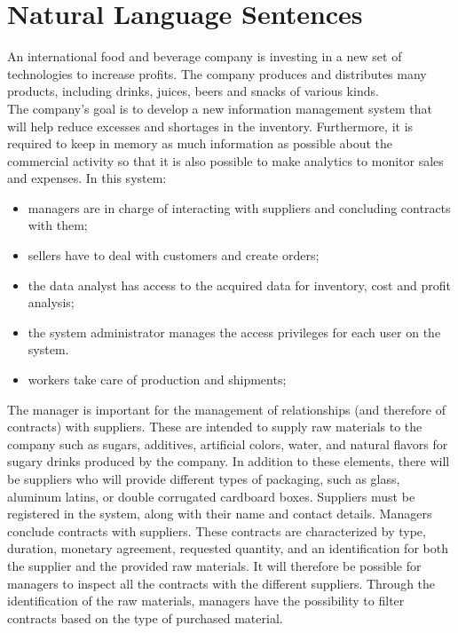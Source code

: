 \section{Natural Language Sentences}

An international food and beverage company is investing in a new set of technologies to increase profits. The company produces and distributes many products, including drinks, juices, beers and snacks of various kinds.\\

The company's goal is to develop a new information management system that will help reduce excesses and shortages in the inventory. Furthermore, it is required to keep in memory as much information as possible about the commercial activity so that it is also possible to make analytics to monitor sales and expenses. In this system:
\begin{itemize}
    \item managers are in charge of interacting with suppliers and concluding contracts with them;
    \item sellers have to deal with customers and create orders;
    \item the data analyst has access to the acquired data for inventory, cost and profit analysis;
    \item the system administrator manages the access privileges for each user on the system.
    \item workers take care of production and shipments;
\end{itemize}

The manager is important for the management of relationships (and therefore of contracts) with suppliers. These are intended to supply raw materials to the company such as sugars, additives, artificial colors, water, and natural flavors for sugary drinks produced by the company. In addition to these elements, there will be suppliers who will provide different types of packaging, such as glass, aluminum latins, or double corrugated cardboard boxes. Suppliers must be registered in the system, along with their name and contact details. Managers conclude contracts with suppliers. These contracts are characterized by type, duration, monetary agreement, requested quantity, and an identification for both the supplier and the provided raw materials. It will therefore be possible for managers to inspect all the contracts with the different suppliers. Through the identification of the raw materials, managers have the possibility to filter contracts based on the type of purchased material.\\

